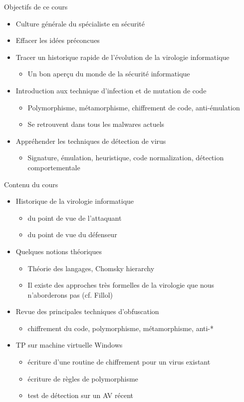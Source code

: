 \documentclass{beamer}
\begin{document}
\begin{frame}{Objectifs de ce cours}
\begin{itemize}
\item Culture générale du spécialiste en sécurité
\item Effacer les idées préconcues
\item Tracer un historique rapide de l'évolution de la virologie informatique
\begin{itemize}
\item Un bon aperçu du monde de la sécurité informatique
\end{itemize}
\item Introduction aux technique d'infection et de mutation de code
\begin{itemize}
\item Polymorphisme, métamorphisme, chiffrement de code, anti-émulation
\item Se retrouvent dans tous les malwares actuels
\end{itemize}
\item Appréhender les techniques de détection de virus
\begin{itemize}
\item Signature, émulation, heuristique, code normalization, détection comportementale
\end{itemize}
\end{itemize}
\end{frame}


\begin{frame}{Contenu du cours}
\begin{itemize}
\item Historique de la virologie informatique
\begin{itemize}
\item du point de vue de l'attaquant
\item du point de vue du défenseur
\end{itemize}
\item Quelques notions théoriques
\begin{itemize}
\item Théorie des langages, Chomsky hierarchy
\item Il existe des approches très formelles de la virologie que nous n'aborderons pas (cf. Fillol)
\end{itemize}
\item Revue des principales techniques d'obfuscation
\begin{itemize}
\item chiffrement du code, polymorphisme, métamorphisme, anti-*
\end{itemize}
\item TP sur machine virtuelle Windows
\begin{itemize}
\item écriture d'une routine de chiffrement pour un virus existant
\item écriture de règles de polymorphisme
\item test de détection sur un AV récent
\end{itemize}
\end{itemize}
\end{frame}
\end{document}

